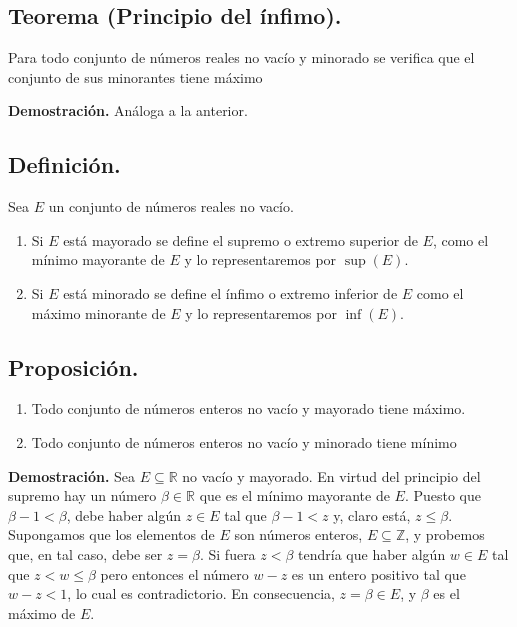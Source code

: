 \documentclass[10pt,a4paper]{article}
\begin{document}
		\subsection{Teorema (Principio del ínfimo).}
		
		Para todo conjunto de números reales no vacío y minorado se verifica que el conjunto de sus minorantes tiene máximo 
		
		\textbf{Demostración.} Análoga a la anterior.	
		
		\subsection{Definición.}
		
		Sea $E$ un conjunto de números reales no vacío.
		\begin{enumerate}[label=\roman*)]
			\item Si $E$ está mayorado se define el supremo o extremo superior de $E$, como el mínimo mayorante
			de $E$ y lo representaremos por $\sup(E)$.
			\item Si $E$ está minorado se define el ínfimo o extremo inferior de $E$ como el máximo minorante de $E$ y lo representaremos por $\inf(E)$.
		\end{enumerate}
	
		\subsection{Proposición.}
		
		\begin{enumerate}[label=\alph*)]
			\item Todo conjunto de números enteros no vacío y mayorado tiene máximo.
			\item Todo conjunto de números enteros no vacío y minorado tiene mínimo
		\end{enumerate}
	
		\textbf{Demostración.} Sea $E \subseteq \mathbb{R}$ no vacío y mayorado. En virtud del principio del supremo hay un número $\beta \in \mathbb{R}$ que es el mínimo mayorante de $E$. Puesto que $\beta-1 < \beta$, debe haber algún $z \in E$ tal que $\beta - 1 < z$ y, claro está, $z \leq \beta$. Supongamos que los elementos de $E$ son números enteros, $E \subseteq \mathbb{Z}$, y probemos que, en tal caso, debe ser $z = \beta$. Si fuera $z < \beta$ tendría que haber algún $w \in E$ tal que $z < w \leq \beta$ pero entonces el número $w - z$ es un entero positivo tal que $w - z < 1$, lo cual es contradictorio. En consecuencia, $z = \beta \in E$, y $\beta$ es el máximo de $E$.
		
\end{document}
